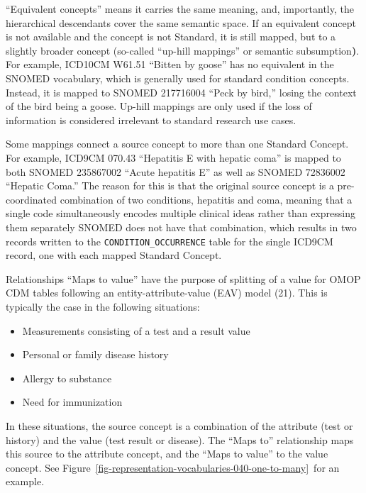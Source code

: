\documentclass[
  letterpaper,
  paper=7in:10in,
  pagesize=pdftex,
  headinclude=on,
  footinclude=on,
  12pt]{scrbook}
\begin{document}
``Equivalent concepts'' means it carries the same meaning, and,
importantly, the hierarchical descendants cover the same semantic space.
If an equivalent concept is not available and the concept is not
Standard, it is still mapped, but to a slightly broader concept
(so-called ``up-hill mappings'' or semantic subsumption\textbf{)}. For
example, ICD10CM W61.51 ``Bitten by goose'' has no equivalent in the
SNOMED vocabulary, which is generally used for standard condition
concepts. Instead, it is mapped to SNOMED 217716004 ``Peck by bird,''
losing the context of the bird being a goose. Up-hill mappings are only
used if the loss of information is considered irrelevant to standard
research use cases.

Some mappings connect a source concept to more than one Standard
Concept. For example, ICD9CM 070.43 ``Hepatitis E with hepatic coma'' is
mapped to both SNOMED 235867002 ``Acute hepatitis E'' as well as SNOMED
72836002 ``Hepatic Coma.'' The reason for this is that the original
source concept is a pre-coordinated combination of two conditions,
hepatitis and coma, meaning that a single code simultaneously encodes
multiple clinical ideas rather than expressing them separately SNOMED
does not have that combination, which results in two records written to
the \texttt{CONDITION\_OCCURRENCE} table for the single ICD9CM record,
one with each mapped Standard Concept.

Relationships ``Maps to value'' have the purpose of splitting of a value
for OMOP CDM tables following an entity-attribute-value (EAV) model
(21). This is typically the case in the following situations:

\begin{itemize}
\item
  Measurements consisting of a test and a result value
\item
  Personal or family disease history
\item
  Allergy to substance
\item
  Need for immunization
\end{itemize}

In these situations, the source concept is a combination of the
attribute (test or history) and the value (test result or disease). The
``Maps to'' relationship maps this source to the attribute concept, and
the ``Maps to value'' to the value concept. See
Figure~\ref{fig-representation-vocabularies-040-one-to-many}~for an
example.
\end{document}
